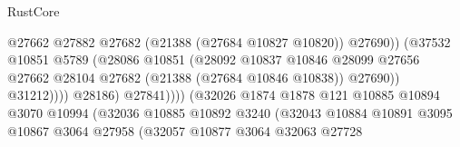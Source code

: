 \begin{lexlean}{RustCore}
\begin{coremodule}
                                                        @27662
                                                        @27882
                                                        @27682
                                                        (@21388 (@27684 @10827 @10820))
                                                        @27690))
                                                    (@37532
                                                      @10851
                                                      @5789
                                                      (@28086
                                                        @10851
                                                        (@28092
                                                          @10837
                                                          @10846
                                                          @28099
                                                          @27656
                                                          @27662
                                                          @28104
                                                          @27682
                                                          (@21388 (@27684 @10846 @10838))
                                                          @27690))
                                                      @31212))))
                                              @28186)
                                            @27841))))
                                    (@32026
                                      @1874
                                      @1878
                                      @121
                                      @10885
                                      @10894
                                      @3070
                                      @10994
                                      (@32036
                                        @10885
                                        @10892
                                        @3240
                                        (@32043
                                          @10884
                                          @10891
                                          @3095
                                          @10867
                                          @3064
                                          @27958
                                          (@32057
                                            @10877
                                            @3064
                                            @32063
                                            @27728

\end{coremodule}
\end{lexlean}
